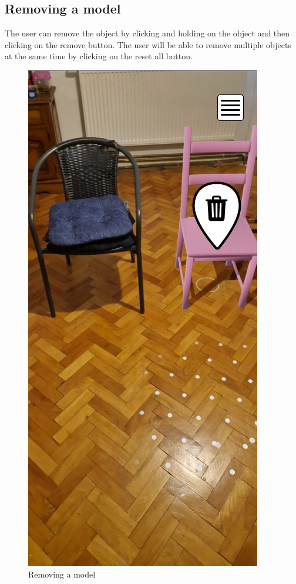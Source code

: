 \subsection{Removing a model}
The user can remove the object by clicking and holding on the object and then clicking on the remove button. The user will be able to remove multiple objects at the same time by clicking on the reset all button.
\begin{figure}[h!]
    \begin{center}
        \includegraphics[scale=0.5]{img/App_mock/iPhone 14 - 7.png}
        \caption{Removing a model}
        \label{fig:remove-a-model}
    \end{center}
\end{figure}
\pagebreak


